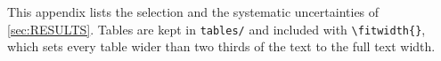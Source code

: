 This appendix lists the selection and the systematic uncertainties of \cref{sec:RESULTS}. Tables are kept in \texttt{tables/} and included with \verb|\fitwidth{}|, which sets every table wider than two thirds of the text to the full text width.



